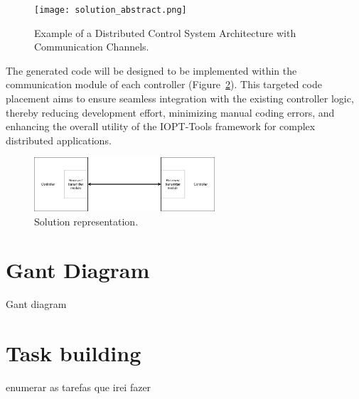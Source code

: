 \begin{figure}[htbp]
  \centering
  \texttt{[image: solution\_abstract.png]}
  \caption{Example of a Distributed Control System Architecture with Communication Channels.}
  \label{fig:distributed_system_example}
\end{figure}

 
The generated code will be designed to be implemented within the communication module of each controller (Figure~\ref{fig:representation}). This targeted code placement aims to ensure seamless integration with the existing controller logic, thereby reducing development effort, minimizing manual coding errors, and enhancing the overall utility of the IOPT-Tools framework for complex distributed applications.


 \begin{figure}[htbp]
  \centering
  \includegraphics[width=0.6\textwidth]{Chapters/Figures/Diagrama.png}
  \caption{Solution representation.}
  \label{fig:representation}
\end{figure}
 
 
 
\section{Gant Diagram }
\label{sec:gant_diagram}

Gant diagram

\section{Task building}
\label{sec:task_building}

enumerar as tarefas que irei fazer
